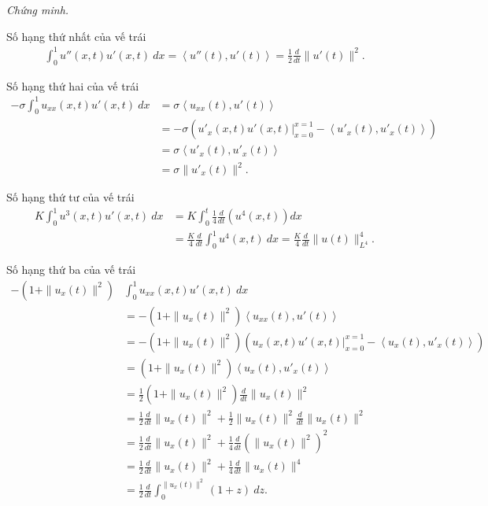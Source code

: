 \documentclass[12pt,a4paper]{article}
\theoremstyle{definition}
\begin{document}
\textit{Chứng minh.}

Số hạng thứ nhất của vế trái
\begin{align*}
    \int_0^1  u''(x,t) u'(x,t)\:dx = \left<u''(t), u'(t)\right> = \frac{1}{2} \frac{d}{dt} \|u'(t)\|^2.
\end{align*}

Số hạng thứ hai của vế trái
\begin{align*}
    -\sigma \int_0^1 u_{xx}(x,t) u'(x,t)\:dx &= \sigma \left<u_{xx}(t), u'(t)\right> \\
    &= -\sigma \left(\left.u'_x(x,t) u'(x,t)\right|_{x=0}^{x=1} - \left<u'_x(t), u'_x(t)\right>\right) \\
    &= \sigma \left<u'_x(t), u'_x(t)\right> \\
    &= \sigma \|u'_x(t)\|^2.
\end{align*}

Số hạng thứ tư của vế trái
\begin{align*}
    K \int_0^1 u^3(x,t) u'(x,t)\:dx &= K \int_0^t \frac{1}{4} \frac{d}{dt} \left(u^4(x,t)\right)dx \\
    &= \frac{K}{4} \frac{d}{dt} \int_0^1 u^4(x,t)\:dx = \frac{K}{4} \frac{d}{dt} \|u(t)\|^4_{L^4}.
\end{align*}

Số hạng thứ ba của vế trái
\begin{align*}
    -\left(1 + \|u_x(t)\|^2\right) &\int_0^1 u_{xx}(x,t) u'(x,t)\:dx \\
    &= -\left(1 + \|u_x(t)\|^2\right) \left<u_{xx}(t), u'(t)\right> \\
    &= -\left(1 + \|u_x(t)\|^2\right) \left(\left.u_x(x,t) u'(x,t)\right|_{x=0}^{x=1} - \left<u_x(t), u'_x(t)\right>\right) \\
    &= \left(1 + \|u_x(t)\|^2\right) \left<u_x(t), u'_x(t)\right> \\
    &= \frac{1}{2} \left(1 + \|u_x(t)\|^2\right) \frac{d}{dt} \|u_x(t)\|^2 \\
    &= \frac{1}{2} \frac{d}{dt} \|u_x(t)\|^2 + \frac{1}{2} \|u_x(t)\|^2 \frac{d}{dt} \|u_x(t)\|^2 \\
    &= \frac{1}{2} \frac{d}{dt} \|u_x(t)\|^2 + \frac{1}{4} \frac{d}{dt} \left( \|u_x(t)\|^2 \right)^2 \\
    &= \frac{1}{2} \frac{d}{dt} \|u_x(t)\|^2 + \frac{1}{4} \frac{d}{dt} \|u_x(t)\|^4 \\
    &= \frac{1}{2} \frac{d}{dt} \int_0^{\|u_x(t)\|^2} (1+z)\:dz.
\end{align*}
\end{document}
